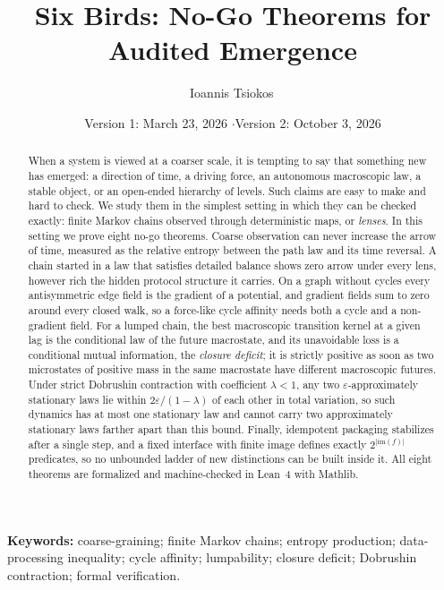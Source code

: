 \documentclass[11pt]{article}
\title{Six Birds: No-Go Theorems for Audited Emergence}
\author{Ioannis Tsiokos\,\orcidlink{0009-0009-7659-5964}}
\date{Version 1: March 23, 2026 \quad$\cdot$\quad Version 2: October 3, 2026}
\theoremstyle{definition}
\newcommand{\1}{\mathbf{1}}
\begin{document}
\maketitle
\thispagestyle{firstpage}
\vspace{0.35em}

\begin{abstract}
When a system is viewed at a coarser scale, it is tempting to say that something new has emerged: a direction of time, a driving force, an autonomous macroscopic law, a stable object, or an open-ended hierarchy of levels.
Such claims are easy to make and hard to check.
We study them in the simplest setting in which they can be checked exactly: finite Markov chains observed through deterministic maps, or \emph{lenses}.
In this setting we prove eight no-go theorems.
Coarse observation can never increase the arrow of time, measured as the relative entropy between the path law and its time reversal.
A chain started in a law that satisfies detailed balance shows zero arrow under every lens, however rich the hidden protocol structure it carries.
On a graph without cycles every antisymmetric edge field is the gradient of a potential, and gradient fields sum to zero around every closed walk, so a force-like cycle affinity needs both a cycle and a non-gradient field.
For a lumped chain, the best macroscopic transition kernel at a given lag is the conditional law of the future macrostate, and its unavoidable loss is a conditional mutual information, the \emph{closure deficit}; it is strictly positive as soon as two microstates of positive mass in the same macrostate have different macroscopic futures.
Under strict Dobrushin contraction with coefficient $\lambda<1$, any two $\varepsilon$-approximately stationary laws lie within $2\varepsilon/(1-\lambda)$ of each other in total variation, so such dynamics has at most one stationary law and cannot carry two approximately stationary laws farther apart than this bound.
Finally, idempotent packaging stabilizes after a single step, and a fixed interface with finite image defines exactly $2^{|\mathrm{im}(f)|}$ predicates, so no unbounded ladder of new distinctions can be built inside it.
All eight theorems are formalized and machine-checked in Lean~4 with Mathlib.
\end{abstract}

\vspace{0.2em}
\noindent\textbf{Keywords:} coarse-graining; finite Markov chains; entropy production; data-processing inequality; cycle affinity; lumpability; closure deficit; Dobrushin contraction; formal verification.
 
\end{document}
